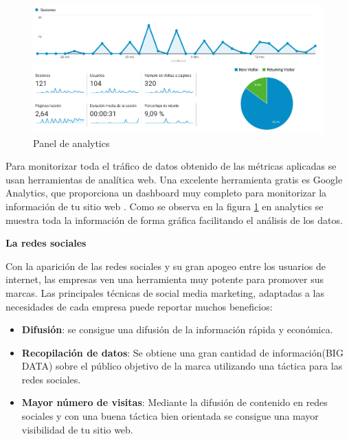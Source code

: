 \begin{figure}
\begin{center}
\includegraphics[width=1.0\textwidth]{imagenes/analytics.png}
\caption{Panel de analytics}
\label{analytics}
\end{center}
\end{figure}

Para monitorizar toda el tráfico de datos obtenido de las métricas aplicadas se usan herramientas de analítica web. Una excelente herramienta gratis es Google Analytics, que proporciona un dashboard muy completo para monitorizar la información de tu sitio web \cite{analytics}. Como se observa en la figura \ref{analytics} en analytics se muestra toda la información de forma gráfica facilitando el análisis de los datos.

\textbf{La redes sociales} 

\vspace{5 mm}

Con la aparición de las redes sociales y su gran apogeo entre los usuarios de internet, las empresas ven una herramienta muy potente para promover sus marcas. Las principales técnicas de social media marketing, adaptadas a las necesidades de cada empresa  puede reportar muchos beneficios:

\begin{itemize}

\item \textbf{Difusión}: se consigue una difusión de la información rápida y económica.

\item \textbf{Recopilación de datos}: Se obtiene una gran cantidad de información(BIG DATA) sobre el público objetivo de la marca utilizando una táctica para las redes sociales.

\item \textbf{Mayor número de visitas}: Mediante la difusión de contenido en redes sociales y con una buena táctica bien orientada se consigue una mayor visibilidad de tu sitio web.

\end{itemize}

